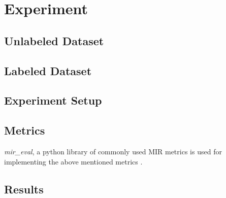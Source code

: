\documentclass{article}
\begin{document}
\section{Experiment}

\subsection{Unlabeled Dataset}

\subsection{Labeled Dataset}

\subsection{Experiment Setup}

\subsection{Metrics}

\textit{mir\_eval}, a python library of commonly used MIR metrics is used for implementing the above mentioned metrics \cite{Raffel2014}. 

\subsection{Results}

\end{document}
